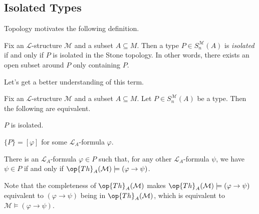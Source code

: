 \documentclass[../notes.tex]{subfiles}
\begin{document}
\subsection{Isolated Types}
Topology motivates the following definition.
\begin{definition}[isolated]
	Fix an $\mathcal L$-structure $\mathcal M$ and a subset $A\subseteq M$. Then a type $P\in S_n^{\mathcal M}(A)$ is \textit{isolated} if and only if $P$ is isolated in the Stone topology. In other words, there exists an open subset around $P$ only containing $P$.
\end{definition}
Let's get a better understanding of this term.
\begin{proposition} \label{prop:how-to-isolated-type}
	Fix an $\mathcal L$-structure $\mathcal M$ and a subset $A\subseteq M$. Let $P\in S_n^{\mathcal M}(A)$ be a type. Then the following are equivalent.
	\begin{listalph}
		\item $P$ is isolated.
		\item $\{P\}=[\varphi]$ for some $\mathcal L_A$-formula $\varphi$.
		\item There is an $\mathcal L_A$-formula $\varphi\in P$ such that, for any other $\mathcal L_A$-formula $\psi$, we have $\psi\in P$ if and only if $\op{Th}_A(\mathcal M)\models(\varphi\to\psi)$.
	\end{listalph}
	Note that the completeness of $\op{Th}_A(\mathcal M)$ makes $\op{Th}_A(\mathcal M)\models(\varphi\to\psi)$ equivalent to $(\varphi\to\psi)$ being in $\op{Th}_A(\mathcal M)$, which is equivalent to $\mathcal M\models(\varphi\to\psi)$.
\end{proposition}
\end{document}
